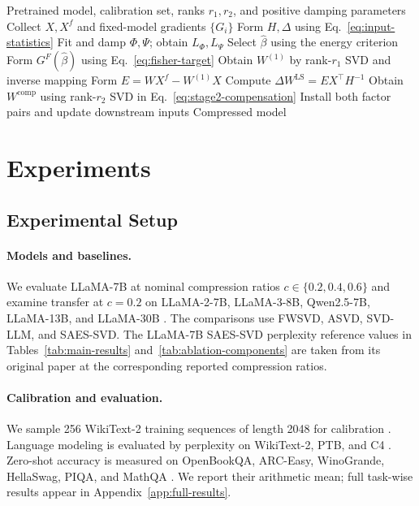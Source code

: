 \documentclass[11pt]{article}
\begin{document}
\begin{algorithm}[t]
\caption{FR-SVD under a shared rank budget}
\label{alg:frsvd}
\small
\begin{algorithmic}[1]
\Require Pretrained model, calibration set, ranks $r_1,r_2$, and positive damping parameters
\State Collect $X,X^f$ and fixed-model gradients $\{G_i\}$
\State Form $H,\Delta$ using Eq.~\eqref{eq:input-statistics}
\State Fit and damp $\Phi,\Psi$; obtain $L_\Phi,L_\Psi$
\State Select $\widehat\beta$ using the energy criterion
\State Form $G^F(\widehat\beta)$ using Eq.~\eqref{eq:fisher-target}
\State Obtain $W^{(1)}$ by rank-$r_1$ SVD and inverse mapping
\State Form $E=WX^f-W^{(1)}X$
\State Compute $\Delta W^{\mathrm{LS}}=EX^\top H^{-1}$
\State Obtain $W^{\mathrm{comp}}$ using rank-$r_2$ SVD in Eq.~\eqref{eq:stage2-compensation}
\State Install both factor pairs and update downstream inputs
\EndFor
\State \Return Compressed model
\end{algorithmic}
\end{algorithm}

\section{Experiments}\label{sec:experiments}

\subsection{Experimental Setup}

\paragraph{Models and baselines.}
We evaluate LLaMA-7B at nominal compression ratios $c\in\{0.2,0.4,0.6\}$ and examine transfer at $c=0.2$ on LLaMA-2-7B, LLaMA-3-8B, Qwen2.5-7B, LLaMA-13B, and LLaMA-30B \citep{touvron2023llama,touvron2023llama2,dubey2024llama3,yang2024qwen25}. The comparisons use FWSVD, ASVD, SVD-LLM, and SAES-SVD. The LLaMA-7B SAES-SVD perplexity reference values in Tables~\ref{tab:main-results} and~\ref{tab:ablation-components} are taken from its original paper at the corresponding reported compression ratios.

\paragraph{Calibration and evaluation.}
We sample 256 WikiText-2 training sequences of length 2048 for calibration \citep{merity2017wikitext2}. Language modeling is evaluated by perplexity on WikiText-2, PTB, and C4 \citep{marcus1993ptb,raffel2020c4}. Zero-shot accuracy is measured on OpenBookQA, ARC-Easy, WinoGrande, HellaSwag, PIQA, and MathQA \citep{mihaylov2018openbook,clark2018think,sakaguchi2021winogrande,zellers2019hellaswag,bisk2020piqa,amini2019mathqa}. We report their arithmetic mean; full task-wise results appear in Appendix~\ref{app:full-results}.
\end{document}
